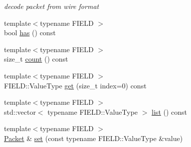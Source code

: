\begin{DoxyCompactItemize}
\begin{DoxyCompactList}\small\item\em decode packet from wire format \end{DoxyCompactList}\item 
{\footnotesize template$<$typename F\+I\+E\+LD $>$ }\\bool \hyperlink{classndn_1_1lp_1_1Packet_abdba1075d299c2161ed1f4df65ac0ac7}{has} () const
\item 
{\footnotesize template$<$typename F\+I\+E\+LD $>$ }\\size\+\_\+t \hyperlink{classndn_1_1lp_1_1Packet_a717bf66d78a04ee7f34049687454575c}{count} () const
\item 
{\footnotesize template$<$typename F\+I\+E\+LD $>$ }\\F\+I\+E\+L\+D\+::\+Value\+Type \hyperlink{classndn_1_1lp_1_1Packet_a6ecf116bacbac3e18e846ccb76922b18}{get} (size\+\_\+t index=0) const
\item 
{\footnotesize template$<$typename F\+I\+E\+LD $>$ }\\std\+::vector$<$ typename F\+I\+E\+L\+D\+::\+Value\+Type $>$ \hyperlink{classndn_1_1lp_1_1Packet_aa1842307ffd503f240fa805d01887910}{list} () const
\item 
{\footnotesize template$<$typename F\+I\+E\+LD $>$ }\\\hyperlink{classndn_1_1lp_1_1Packet}{Packet} \& \hyperlink{classndn_1_1lp_1_1Packet_a895c5bfdcc1098fbcd0c17dadfff4bca}{set} (const typename F\+I\+E\+L\+D\+::\+Value\+Type \&value)\hypertarget{classndn_1_1lp_1_1Packet_a895c5bfdcc1098fbcd0c17dadfff4bca}{}\label{classndn_1_1lp_1_1Packet_a895c5bfdcc1098fbcd0c17dadfff4bca}


\end{DoxyCompactItemize}
